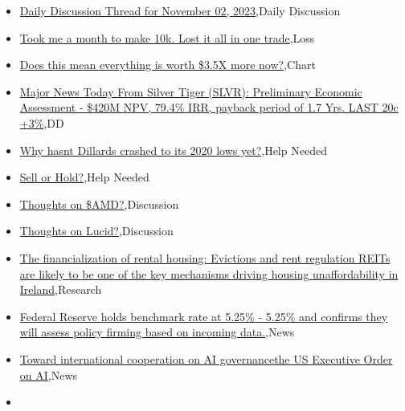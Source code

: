 \documentclass{article}%
\begin{document}
%
\begin{itemize}%
\item%
\href{https://reddit.com/r/wallstreetbets/comments/17m00ac/daily\_discussion\_thread\_for\_november\_02\_2023/}{Daily Discussion Thread for November 02, 2023},Daily Discussion%
\item%
\href{https://reddit.com/r/wallstreetbets/comments/17lyuch/took\_me\_a\_month\_to\_make\_10k\_lost\_it\_all\_in\_one/}{Took me a month to make 10k. Lost it all in one trade},Loss%
\item%
\href{https://reddit.com/r/wallstreetbets/comments/17lykt1/does\_this\_mean\_everything\_is\_worth\_35x\_more\_now/}{Does this mean everything is worth \$3.5X more now?},Chart%
\item%
\href{https://reddit.com/r/Baystreetbets/comments/17lfmk6/major\_news\_today\_from\_silver\_tiger\_slvr/}{Major News Today From Silver Tiger (SLVR): Preliminary Economic Assessment - \$420M NPV, 79.4\% IRR, payback period of 1.7 Yrs. LAST 20c +3\%},DD%
\item%
\href{https://reddit.com/r/StockMarket/comments/17llutk/why\_hasnt\_dillards\_crashed\_to\_its\_2020\_lows\_yet/}{Why hasnt Dillards crashed to its 2020 lows yet?},Help Needed%
\item%
\href{https://reddit.com/r/StockMarket/comments/17lg0wy/sell\_or\_hold/}{Sell or Hold?},Help Needed%
\item%
\href{https://reddit.com/r/StockMarket/comments/17leoks/thoughts\_on\_amd/}{Thoughts on \$AMD?},Discussion%
\item%
\href{https://reddit.com/r/StockMarket/comments/17l948o/thoughts\_on\_lucid/}{Thoughts on Lucid?},Discussion%
\item%
\href{https://reddit.com/r/Economics/comments/17ljhyz/the\_financialization\_of\_rental\_housing\_evictions/}{The financialization of rental housing: Evictions and rent regulation  REITs are likely to be one of the key mechanisms driving housing unaffordability in Ireland},Research%
\item%
\href{https://reddit.com/r/Economics/comments/17li5rk/federal\_reserve\_holds\_benchmark\_rate\_at\_525\_525/}{Federal Reserve holds benchmark rate at 5.25\% - 5.25\% and confirms they will assess policy firming based on incoming data.},News%
\item%
\href{https://reddit.com/r/Economics/comments/17lfzqn/toward\_international\_cooperation\_on\_ai/}{Toward international cooperation on AI governancethe US Executive Order on AI},News%
\item%

\end{itemize}
\end{document}

